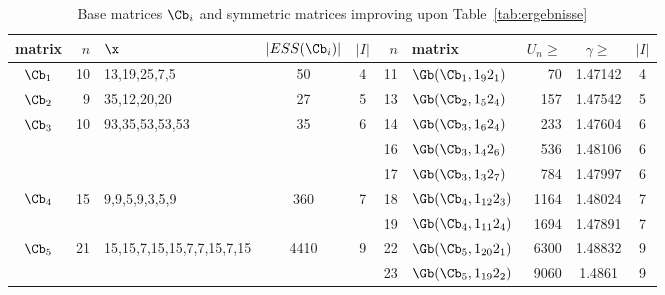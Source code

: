 \documentclass[moor]{informs3}              %
\begin{document}
\begin{table}[ht]
\caption{Base matrices $\Cb_i$ and symmetric matrices improving upon Table~\ref{tab:ergebnisse}}
\label{tab:ergebnisse noncircular}
\begin{tabular}{|crlcc|rlrcc|}
  \hline
matrix & $n$ & $\x$ & $|ESS(\Cb_i)|$ & $|I|$& $n$ & matrix & $U_n \geq$ &$\gamma \geq$ & $|I|$\\
  \hline
  $\Cb_1$ & 10 & 13,19,25,7,5 & 50  &  4 & 11 & $\Gb(\Cb_1,1_92_1)$ 					 & 70 & 1.47142  & 4\\
  \hline
  $\Cb_2$ & 9 & 35,12,20,20 & 27  &  5 & 13 & $\Gb(\Cb_2,1_52_4)$ 							 & 157 & 1.47542  & 5 \\
  \hline
  $\Cb_3$ & 10 & 93,35,53,53,53 & 35  &  6 & 14 & $\Gb(\Cb_3,1_62_4)$ 						 & 233 & 1.47604  & 6 \\
  &&&&&16 & $\Gb(\Cb_3,1_42_6)$ 						 & 536 & 1.48106  & 6 \\
  &&&&&17 & $\Gb(\Cb_3,1_32_7)$ 						 & 784 & 1.47997  & 6 \\
  \hline
  $\Cb_4$ & 15 & 9,9,5,9,3,5,9 & 360  & 7 &18 & $\Gb(\Cb_4,1_{12}2_3)$ 				 & 1164 & 1.48024  & 7 \\
  &&&&&19 & $\Gb(\Cb_4,1_{11}2_4)$ 				 & 1694 & 1.47891  & 7 \\
  \hline
  $\Cb_5$ & 21 & 15,15,7,15,15,7,7,15,7,15 & 4410  & 9 & 22 & $\Gb(\Cb_5,1_{20}2_1)$ 						 & 6300 & 1.48832  & 9 \\
  &&&&&23 & $\Gb(\Cb_5,1_{19}2_2)$ 						 & 9060 & 1.4861  & 9 \\
     \hline
\end{tabular}
\end{table}
\end{document}
